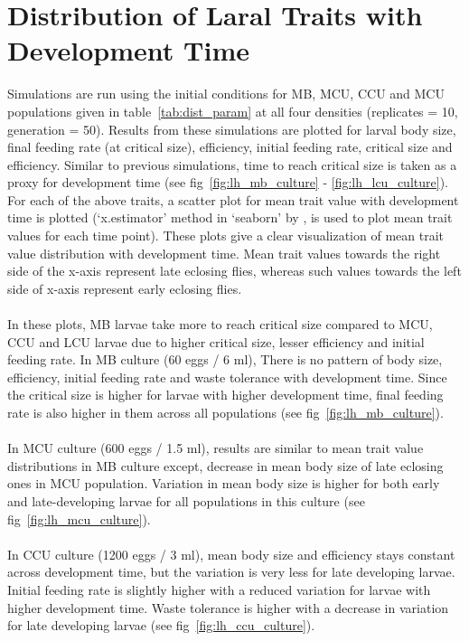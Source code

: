 \section{Distribution of Laral Traits with Development Time}
Simulations are run using the initial conditions for MB, MCU, CCU and MCU populations given in table~\ref{tab:dist_param} at all four densities (replicates = 10, generation = 50). Results from these simulations are plotted for larval body size, final feeding rate (at critical size), efficiency, initial feeding rate, critical size and efficiency. Similar to previous simulations, time to reach critical size is taken as a proxy for development time (see fig~\ref{fig:lh_mb_culture} - \ref{fig:lh_lcu_culture}). For each of the above traits, a scatter plot for mean trait value with development time is plotted (‘x.estimator’ method in ‘seaborn’ by \citet{michael_waskom_2017_883859}, is used to plot mean trait values for each time point). These plots give a clear visualization of mean trait value distribution with development time. Mean trait values towards the right side of the x-axis represent late eclosing flies, whereas such values towards the left side of x-axis represent early eclosing flies.\\\\
In these plots, MB larvae take more to reach critical size compared to MCU, CCU and LCU larvae due to higher critical size, lesser efficiency and initial feeding rate. In MB culture (60 eggs / 6 ml), There is no pattern of body size, efficiency, initial feeding rate and waste tolerance with development time. Since the critical size is higher for larvae with higher development time, final feeding rate is also higher in them across all populations (see fig~\ref{fig:lh_mb_culture}). \\\\
In MCU culture (600 eggs / 1.5 ml), results are similar to mean trait value distributions in MB culture except, decrease in mean body size of late eclosing ones in MCU population. Variation in mean body size is higher for both early and late-developing larvae for all populations in this culture (see fig~\ref{fig:lh_mcu_culture}). \\\\
In CCU culture (1200 eggs / 3 ml), mean body size and efficiency stays constant across development time, but the variation is very less for late developing larvae. Initial feeding rate is slightly higher with a reduced variation for larvae with higher development time. Waste tolerance is higher with a decrease in variation for late developing larvae (see fig~\ref{fig:lh_ccu_culture}). \\\\
